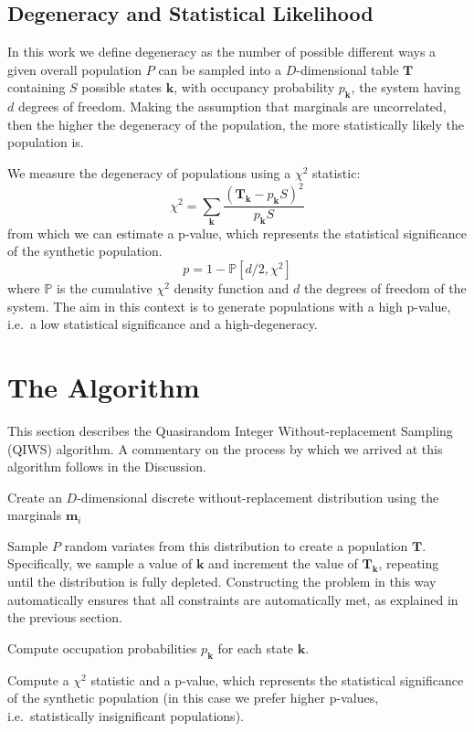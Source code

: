 \documentclass{JASSS}
\begin{document}
\subsection{Degeneracy and Statistical
Likelihood}\label{degeneracy-and-statistical-likelihood}

In this work we define degeneracy as the number of possible different
ways a given overall population \(P\) can be sampled into a \(D\)-dimensional table
\(\mathbf{T}\) containing \(S\) possible states \(\mathbf{k}\), with
occupancy probability \(p_\mathbf{k}\), the system having \(d\) degrees
of freedom. Making the assumption that marginals are uncorrelated, then the
higher the degeneracy of the population, the more statistically likely
the population is.

We measure the degeneracy of populations using a \(\chi^2\) statistic:
\begin{equation}
\chi^2 = \sum\limits_{\mathbf{k}}\frac{(\mathbf{T}_\mathbf{k}-p_\mathbf{k}S)^2}{p_\mathbf{k}S}
\end{equation}
from which we can estimate a p-value, which represents the statistical
significance of the synthetic population.
\begin{equation}
p=1-\mathbb{P}[d/2,\chi^2] 
\end{equation}
where \(\mathbb{P}\) is the cumulative
\(\chi^2\) density function and \(d\) the degrees of freedom of the
system. The aim in this context is to generate populations with a high
p-value, i.e.~a low statistical significance and a high-degeneracy.

\section{The Algorithm}\label{the-algorithm}

This section describes the Quasirandom Integer Without-replacement Sampling (QIWS) algorithm. A commentary on the process by which we arrived at this algorithm follows in the Discussion.

\begin{enumerate*}
\item
  Create an \(D\)-dimensional discrete without-replacement distribution
  using the marginals \(\mathbf{m}_i\)
\item
  Sample \(P\) random variates from this distribution to create a
  population \(\mathbf{T}\). Specifically, we sample a value of
  \(\mathbf{k}\) and increment the value of \(\mathbf{T}_\mathbf{k}\),
  repeating until the distribution is fully depleted. Constructing the
  problem in this way automatically ensures that all constraints are
  automatically met, as explained in the previous section.
\item
  Compute occupation probabilities \(p_\mathbf{k}\) for each state
  \(\mathbf{k}\).
\item
  Compute a \(\chi^2\) statistic and a p-value, which represents the
  statistical significance of the synthetic population (in this case we
  prefer higher p-values, i.e.~statistically insignificant populations).
\end{enumerate*}
\end{document}
